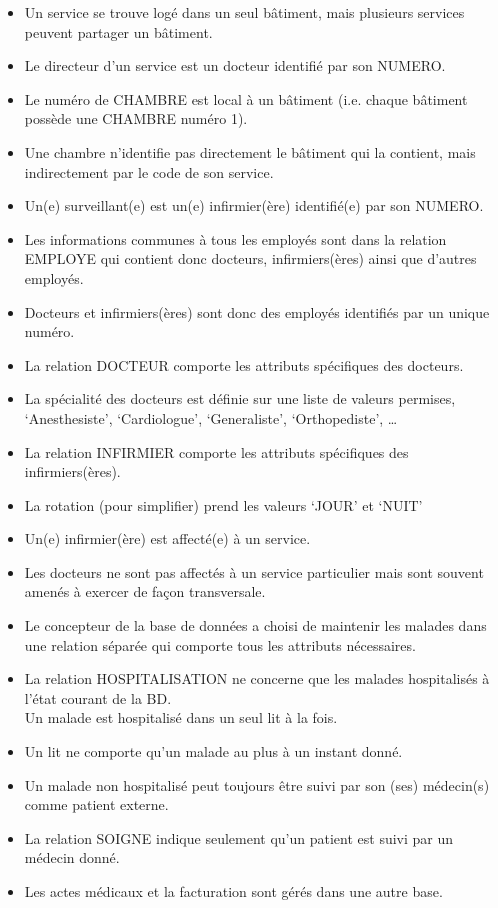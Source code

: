 \documentclass[a4paper,10pt,eval]{nsi}
\begin{document}
\begin{itemize}
	\item Un service se trouve logé dans un seul bâtiment, mais plusieurs services peuvent partager
	un bâtiment.
	\item  Le directeur d'un service est un docteur identifié par son NUMERO.
	\item  Le numéro de CHAMBRE est local à un bâtiment (i.e. chaque bâtiment possède une
	CHAMBRE numéro 1).
	\item  Une chambre n'identifie pas directement le bâtiment qui la contient, mais indirectement
	par le code de son service.
	\item  Un(e) surveillant(e) est un(e) infirmier(ère) identifié(e) par son NUMERO.
	\item  Les informations communes à tous les employés sont dans la relation EMPLOYE qui
	contient donc docteurs, infirmiers(ères) ainsi que d'autres employés.
	\item  Docteurs et infirmiers(ères) sont donc des employés identifiés par un unique numéro.
	\item  La relation DOCTEUR comporte les attributs spécifiques des docteurs.
	\item  La spécialité des docteurs est définie sur une liste de valeurs permises, ‘Anesthesiste',
	‘Cardiologue', ‘Generaliste', ‘Orthopediste', …
	\item  La relation INFIRMIER comporte les attributs spécifiques des infirmiers(ères).
	\item  La rotation (pour simplifier) prend les valeurs ‘JOUR' et ‘NUIT'
	\item  Un(e) infirmier(ère) est affecté(e) à un service.
	\item  Les docteurs ne sont pas affectés à un service particulier mais sont souvent amenés à
	exercer de façon transversale.
	\item  Le concepteur de la base de données a choisi de maintenir les malades dans une relation
	séparée qui comporte tous les attributs nécessaires.
	\item  La relation HOSPITALISATION ne concerne que les malades hospitalisés à l'état courant
	de la BD.\\
	Un malade est hospitalisé dans un seul lit à la fois.
	\item  Un lit ne comporte qu'un malade au plus à un instant donné.
	\item  Un malade non hospitalisé peut toujours être suivi par son (ses) médecin(s) comme patient
	externe.
	\item  La relation SOIGNE indique seulement qu'un patient est suivi par un médecin donné.
	\item  Les actes médicaux et la facturation sont gérés dans une autre base.\\
\end{itemize}
\end{document}
